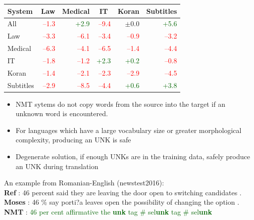 \documentclass[landscape]{jhuslides3C}
\begin{document}
\vspace{10mm}
\begin{center}
\begin{tabular}{l|r|r|r|r|r}
\bf System & \multicolumn{1}{c|}{\bf Law} & \multicolumn{1}{c|}{\bf Medical} & \multicolumn{1}{c|}{\bf IT} & \multicolumn{1}{c|}{\bf Koran} & \multicolumn{1}{c}{\bf Subtitles} \\ \hline
All & \textcolor{red}{--1.3} & \textcolor{darkgreen}{+2.9} & \textcolor{red}{--9.4} & $\pm$0.0 & \textcolor{darkgreen}{+5.6} \\ \hline
Law & \textcolor{red}{--3.3} & \textcolor{red}{--6.1} & \textcolor{red}{--3.4} & \textcolor{red}{--0.9} & \textcolor{red}{--3.2}\\ 
Medical & \textcolor{red}{--6.3} & \textcolor{red}{--4.1} & \textcolor{red}{--6.5} & \textcolor{red}{--1.4} & \textcolor{red}{--4.4} \\
IT & \textcolor{red}{--1.8} & \textcolor{red}{--1.2} & \textcolor{darkgreen}{+2.3} & \textcolor{darkgreen}{+0.2 } & \textcolor{red}{--0.8} \\
Koran & \textcolor{red}{--1.4} & \textcolor{red}{--2.1} & \textcolor{red}{--2.3} & \textcolor{red}{--2.9} & \textcolor{red}{--4.5} \\
Subtitles & \textcolor{red}{--2.9} & \textcolor{red}{--8.5} & \textcolor{red}{--4.4} & \textcolor{darkgreen}{+0.6} &  \textcolor{darkgreen}{+3.8} \\
\end{tabular}
\end{center}

\begin{itemize}
	\item NMT sytems do not copy words from the source into the target if an unknown word is encountered. 	\item For languages which have a large vocabulary size or greater morphological complexity, producing an UNK is safe
	\item Degenerate solution, if enough UNKs are in the training data, safely produce an UNK during translation
\end{itemize}

\vspace{1mm}
An example from Romanian-English (newstest2016):\\
\textbf{Ref} : 46 percent said they are leaving the door open to switching candidates .\\
\textbf{Moses} : \textcolor{verydarkorange}{46 \% say porti?a leaves open the possibility of changing the option .}\\
\textbf{NMT} : \textcolor{darkgreen}{46 per cent affirmative the \textbf{unk} tag \# sel\textbf{unk} tag \# sel\textbf{unk}}\\
\end{document}
